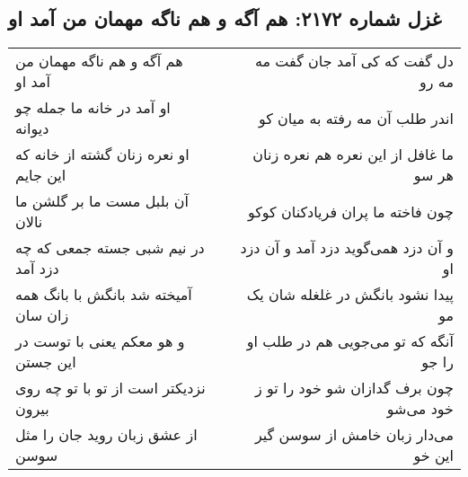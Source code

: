 \begin{center}
\section*{غزل شماره ۲۱۷۲: هم آگه و هم ناگه مهمان من آمد او}
\label{sec:2172}
\begin{longtable}{l p{0.5cm} r}
هم آگه و هم ناگه مهمان من آمد او
&&
دل گفت که کی آمد جان گفت مه مه رو
\\
او آمد در خانه ما جمله چو دیوانه
&&
اندر طلب آن مه رفته به میان کو
\\
او نعره زنان گشته از خانه که این جایم
&&
ما غافل از این نعره هم نعره زنان هر سو
\\
آن بلبل مست ما بر گلشن ما نالان
&&
چون فاخته ما پران فریادکنان کوکو
\\
در نیم شبی جسته جمعی که چه دزد آمد
&&
و آن دزد همی‌گوید دزد آمد و آن دزد او
\\
آمیخته شد بانگش با بانگ همه زان سان
&&
پیدا نشود بانگش در غلغله شان یک مو
\\
و هو معکم یعنی با توست در این جستن
&&
آنگه که تو می‌جویی هم در طلب او را جو
\\
نزدیکتر است از تو با تو چه روی بیرون
&&
چون برف گدازان شو خود را تو ز خود می‌شو
\\
از عشق زبان روید جان را مثل سوسن
&&
می‌دار زبان خامش از سوسن گیر این خو
\\
\end{longtable}
\end{center}
